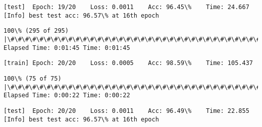 \documentclass[11pt]{article}
\begin{document}
    \begin{Verbatim}[commandchars=\\\{\}]
[test]	Epoch: 19/20	Loss: 0.0011	Acc: 96.45\%	Time: 24.667
[Info] best test acc: 96.57\% at 16th epoch

    \end{Verbatim}

    \begin{Verbatim}[commandchars=\\\{\}]
100\% (295 of 295) |\#\#\#\#\#\#\#\#\#\#\#\#\#\#\#\#\#\#\#\#\#\#\#\#\#\#\#\#\#\#\#\#\#\#\#\#\#\#\#\#\#\#\#\#\#\#\#\#\#\#\#\#\#\#\#\#\#\#\#\#\#\#\#| Elapsed Time: 0:01:45 Time: 0:01:45

    \end{Verbatim}

    \begin{Verbatim}[commandchars=\\\{\}]
[train]	Epoch: 20/20	Loss: 0.0005	Acc: 98.59\%	Time: 105.437

    \end{Verbatim}

    \begin{Verbatim}[commandchars=\\\{\}]
100\% (75 of 75) |\#\#\#\#\#\#\#\#\#\#\#\#\#\#\#\#\#\#\#\#\#\#\#\#\#\#\#\#\#\#\#\#\#\#\#\#\#\#\#\#\#\#\#\#\#\#\#\#\#\#\#\#\#\#\#\#\#\#\#\#\#\#\#\#\#| Elapsed Time: 0:00:22 Time: 0:00:22

    \end{Verbatim}

    \begin{Verbatim}[commandchars=\\\{\}]
[test]	Epoch: 20/20	Loss: 0.0011	Acc: 96.49\%	Time: 22.855
[Info] best test acc: 96.57\% at 16th epoch

    \end{Verbatim}
\end{document}
